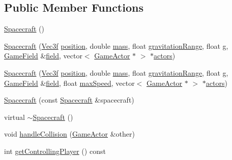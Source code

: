 \subsection*{Public Member Functions}
\begin{DoxyCompactItemize}
\item 
\hyperlink{class_spacecraft_a93c3e7d6d270c6efd9bec0f9229e688a}{Spacecraft} ()
\item 
\hyperlink{class_spacecraft_a1e1fbdad5696627f57c3b9bcfd078a2e}{Spacecraft} (\hyperlink{class_vec3f}{Vec3f} \hyperlink{class_game_actor_aefed3c91bf32ad388d86657b3bb9ddfa}{position}, double \hyperlink{class_game_actor_a2111233f4f0216db4d172d5088ebeed4}{mass}, float \hyperlink{class_game_actor_a9c0ba51b08a3e617d9629c0ee8d309f2}{gravitation\+Range}, float \hyperlink{class_game_actor_a42ed4bef0d99cf053ff9a025c86d34d3}{g}, \hyperlink{class_game_field}{Game\+Field} \&\hyperlink{class_game_actor_a0224fbc502abd6b7579787aa234332d5}{field}, vector$<$ \hyperlink{class_game_actor}{Game\+Actor} $\ast$ $>$ $\ast$\hyperlink{class_game_actor_a2405618d895f5143b42ae9e94d20e693}{actors})
\item 
\hyperlink{class_spacecraft_ad3d183c88aac7dc81ccde4fe1c11c607}{Spacecraft} (\hyperlink{class_vec3f}{Vec3f} \hyperlink{class_game_actor_aefed3c91bf32ad388d86657b3bb9ddfa}{position}, double \hyperlink{class_game_actor_a2111233f4f0216db4d172d5088ebeed4}{mass}, float \hyperlink{class_game_actor_a9c0ba51b08a3e617d9629c0ee8d309f2}{gravitation\+Range}, float \hyperlink{class_game_actor_a42ed4bef0d99cf053ff9a025c86d34d3}{g}, \hyperlink{class_game_field}{Game\+Field} \&\hyperlink{class_game_actor_a0224fbc502abd6b7579787aa234332d5}{field}, float \hyperlink{class_game_actor_a15b6abd006c52b21c569932f8b484eb0}{max\+Speed}, vector$<$ \hyperlink{class_game_actor}{Game\+Actor} $\ast$ $>$ $\ast$\hyperlink{class_game_actor_a2405618d895f5143b42ae9e94d20e693}{actors})
\item 
\hyperlink{class_spacecraft_aeb5ea1964f119583c0bccca819405ea1}{Spacecraft} (const \hyperlink{class_spacecraft}{Spacecraft} \&spacecraft)
\item 
virtual \hyperlink{class_spacecraft_ac0e87c9c8fae261371f401895e428f96}{$\sim$\+Spacecraft} ()
\item 
void \hyperlink{class_spacecraft_a52608575fde91a502be1621b348884ec}{handle\+Collision} (\hyperlink{class_game_actor}{Game\+Actor} \&other)
\item 
int \hyperlink{class_spacecraft_a9c5a89e4cf64d6fca1cfbd3f2fe6be2e}{get\+Controlling\+Player} () const 
\item 

\end{DoxyCompactItemize}
